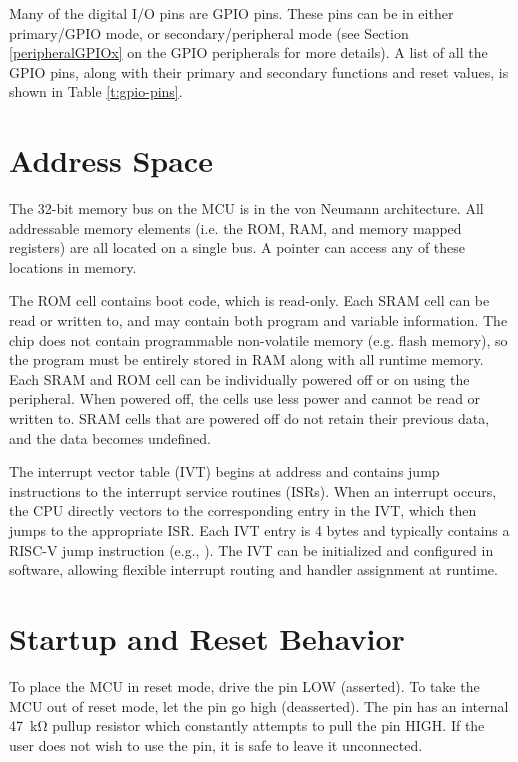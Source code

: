 \documentclass[11pt,pdftex,portrait,letterpaper]{article}
\begin{document}


Many of the digital I/O pins are GPIO pins. These pins can be in either primary/GPIO mode, or secondary/peripheral mode (see Section \ref{peripheralGPIOx} on the GPIO peripherals for more details). A list of all the GPIO pins, along with their primary and secondary functions and reset values, is shown in Table \ref{t:gpio-pins}.



\newpage



\section{Address Space} \label{s:addressSpace}
\resizebox{!}{0.75\height}{}

The 32-bit memory bus on the MCU is in the von Neumann architecture. All addressable memory elements (i.e. the ROM, RAM, and memory mapped registers) are all located on a single bus. A pointer can access any of these locations in memory.

The ROM cell contains boot code, which is read-only. Each SRAM cell can be read or written to, and may contain both program and variable information. The chip does not contain programmable non-volatile memory (e.g. flash memory), so the program must be entirely stored in RAM along with all runtime memory. Each SRAM and ROM cell can be individually powered off or on using the  peripheral. When powered off, the cells use less power and cannot be read or written to. SRAM cells that are powered off do not retain their previous data, and the data becomes undefined.


The interrupt vector table (IVT) begins at address \texttt{\VectorsStartAddress} and contains jump instructions to the interrupt service routines (ISRs). When an interrupt occurs, the CPU directly vectors to the corresponding entry in the IVT, which then jumps to the appropriate ISR. Each IVT entry is 4 bytes and typically contains a RISC-V jump instruction (e.g., ). The IVT can be initialized and configured in software, allowing flexible interrupt routing and handler assignment at runtime.

\newpage



\section{Startup and Reset Behavior} \label{s:startup}
To place the MCU in reset mode, drive the  pin LOW (asserted). To take the MCU out of reset mode, let the  pin go high (deasserted). The  pin has an internal 47~\si{\kilo\ohm} pullup resistor which constantly attempts to pull the  pin HIGH. If the user does not wish to use the  pin, it is safe to leave it unconnected.
\end{document}
